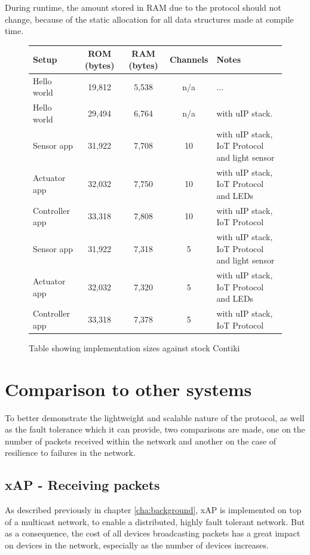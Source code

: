 During runtime, the amount stored in RAM due to the protocol should not change, because of the static allocation for all data structures made at compile time.
\begin{figure}[h]
\begin{center}
    \begin{tabular}{| l | c | c | c | l |}
    \hline
    Setup & ROM (bytes) & RAM (bytes) & Channels & Notes \\ \hline
    Hello world & 19,812 & 5,538 & n/a &... \\ \hline
    Hello world & 29,494 & 6,764 & n/a & with uIP stack. \\ \hline
    Sensor app & 31,922 & 7,708 & 10 & with uIP stack, IoT Protocol and light sensor\\ \hline
    Actuator app & 32,032 & 7,750 & 10 & with uIP stack, IoT Protocol and LEDs \\ \hline
    Controller app & 33,318 & 7,808 & 10 & with uIP stack, IoT Protocol \\ \hline
    Sensor app & 31,922 & 7,318 & 5 & with uIP stack, IoT Protocol and light sensor\\ \hline
    Actuator app & 32,032 & 7,320 & 5 & with uIP stack, IoT Protocol and LEDs \\ \hline
    Controller app & 33,318 & 7,378 & 5 & with uIP stack, IoT Protocol \\ 
    \hline
    \end{tabular}
\end{center}
\caption{Table showing implementation sizes against stock Contiki}
\label{tab:size}
\end{figure}

\section{Comparison to other systems} %
\label{sec:comparison_to_other_systems}
To better demonstrate the lightweight and scalable nature of the protocol, as well as the fault tolerance which it can provide, two comparisons are made, one on the number of packets received within the network and another on the case of resilience to failures in the network.

\subsection{xAP - Receiving packets} %
\label{sub:xap-packets}
As described previously in chapter \ref{cha:background}, xAP is implemented on top of a multicast network, to enable a distributed, highly fault tolerant network. But as a consequence, the cost of all devices broadcasting packets has a great impact on devices in the network, especially as the number of devices increases. 

